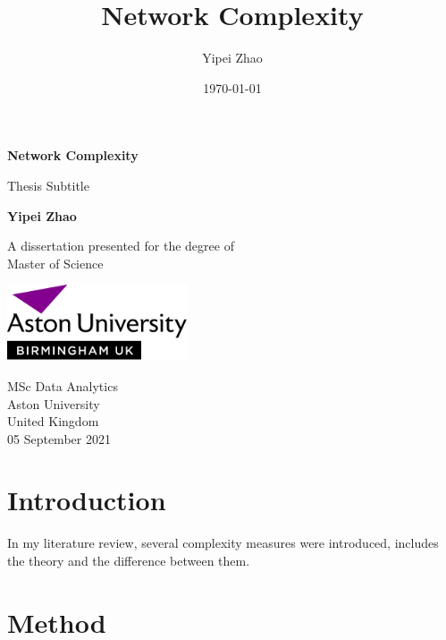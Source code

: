 \documentclass[12pt]{article}
\title{Network Complexity}
\author{Yipei Zhao}
\date{\today}
\begin{document}
\begin{titlepage}
    \begin{center}
        \vspace*{1cm}
            
        \Huge
        \textbf{Network Complexity}
            
        \vspace{0.5cm}
        \LARGE
        Thesis Subtitle
            
        \vspace{1.5cm}
            
        \textbf{Yipei Zhao}
            
        \vfill
            
        A dissertation presented for the degree of\\
        Master of Science
            
        \vspace{0.8cm}
            
        \includegraphics[width=0.4\textwidth]{university.png}
            
        \Large
        MSc Data Analytics\\
        Aston University\\
        United Kingdom\\
        05 September 2021
            
    \end{center}
\end{titlepage}
\section{Introduction}
In my literature review, several complexity measures were introduced, includes the theory and the difference between them. 

\section{Method}
\end{document}
